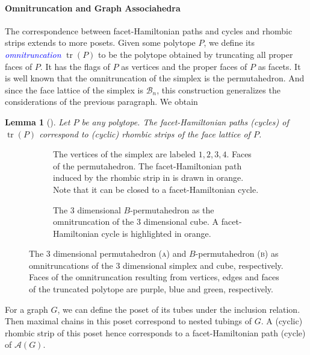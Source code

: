 \documentclass[fontsize=11pt,a4paper,DIV=12]{scrartcl}
\newcommand{\defn}[1]{\textsl{\textcolor{Blue}{#1}}}
\newtheorem{lemma}[theorem]{Lemma}
\DeclareMathOperator{\tr}{tr}
\begin{document}
\paragraph{Omnitruncation and Graph Associahedra}
The correspondence between facet-Hamiltonian paths and cycles and rhombic strips extends to more posets. Given some polytope $P$, we define its \defn{omnitruncation} $\tr(P)$ to be the polytope obtained by truncating all proper faces of $P$. It has the flags of $P$ as vertices and the proper faces of $P$ as facets. It is well known that the omnitruncation of the simplex is the permutahedron. And since the face lattice of the simplex is $\mathcal B_n$, this construction generalizes the considerations of the previous paragraph. We obtain
\begin{lemma}[\cite{facethamiltonicity}]
    Let $P$ be any polytope. The facet-Hamiltonian paths (cycles) of $\tr(P)$ correspond to (cyclic) rhombic strips of the face lattice of $P$.
\end{lemma}

\begin{figure}
    \centering
    \begin{subfigure}[b]{0.48\textwidth}
        \centering
        
        \caption{The vertices of the simplex are labeled $1,2,3,4$. Faces of the permutahedron. The facet-Hamiltonian path induced by the rhombic strip in  is drawn in orange. Note that it can be closed to a facet-Hamiltonian cycle.}
        \label{fig:perm as truncation}
    \end{subfigure}
    \hfill
    \begin{subfigure}[b]{0.48\textwidth}
        \centering
        
        \caption{The 3 dimensional $B$-permutahedron as the omnitruncation of the 3 dimensional cube. A facet-Hamiltonian cycle is highlighted in orange.}
        \label{fig:Bperm}
    \end{subfigure}
    \caption{The 3 dimensional permutahedron (\textsc{a}) and $B$-permutahedron (\textsc{b}) as omnitruncations of the 3 dimensional simplex and cube, respectively. Faces of the omnitruncation resulting from vertices, edges and faces of the truncated polytope are purple, blue and green, respectively.}
    \label{fig:omnitruncation}
\end{figure}
For a graph $G$, we can define the poset of its tubes under the inclusion relation. Then maximal chains in this poset correspond to nested tubings of $G$. A (cyclic) rhombic strip of this poset hence corresponds to a facet-Hamiltonian path (cycle) of $\mathcal A(G)$.
\end{document}
